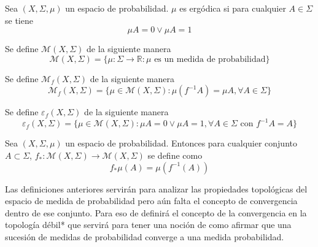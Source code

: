 \begin{definicion}
	Sea $(X,\Sigma,\mu)$ un espacio de probabilidad. $\mu$ es ergódica si para cualquier $A \in \Sigma$ se tiene	
	\begin{equation}
		\mu A = 0 \vee \mu A = 1
	\end{equation}
\end{definicion}

\begin{definicion}
	Se define $\mathcal{M}(X,\Sigma)$ de la siguiente manera	
	\begin{equation}
		\mathcal{M}(X,\Sigma) = \{\mu: \Sigma \rightarrow \mathbb{R}: \mu \text{ es un medida de probabilidad} \}
	\end{equation}
\end{definicion}

\begin{definicion}
	Se define $\mathcal{M}_f(X,\Sigma)$ de la siguiente manera	
	\begin{equation}
		\mathcal{M}_f(X,\Sigma) = \{ \mu \in \mathcal{M}(X,\Sigma): \mu(f^{-1} A) = \mu A, \forall A \in \Sigma \}
	\end{equation}
\end{definicion}

\begin{definicion}
	Se define $\varepsilon_f(X,\Sigma)$ de la siguiente manera	
	\begin{equation}
		\varepsilon_f(X,\Sigma) = \{ \mu \in \mathcal{M}(X,\Sigma): \mu A = 0 \vee \mu A = 1, \forall A \in \Sigma \text{ con } f^{-1}A = A  \}
	\end{equation}
\end{definicion}

\begin{definicion}
	Sea $(X,\Sigma,\mu)$ un espacio de probabilidad. Entonces para cualquier conjunto $A \subset \Sigma$, $f_*: \mathcal{M}(X,\Sigma) \rightarrow \mathcal{M}(X,\Sigma)$ se define como	
	\begin{equation}
		f_*\mu(A) = \mu(f^{-1}(A))
	\end{equation}
\end{definicion}

Las definiciones anteriores servirán para analizar las propiedades topológicas del espacio de medida de probabilidad pero aún falta el concepto de convergencia dentro de ese conjunto. Para eso de definirá el concepto de la convergencia en la topología débil* que servirá para tener una noción de como afirmar que una sucesión de medidas de probabilidad converge a una medida probabilidad.

